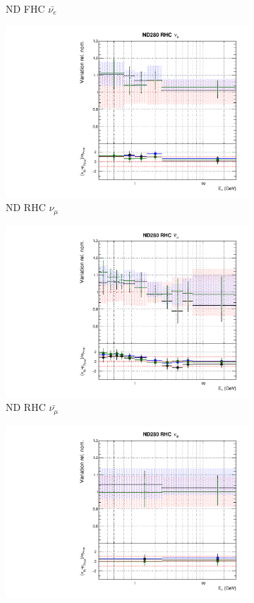 \begin{figure}
\begin{subfigure}{0.45\textwidth}
  \caption{ND FHC $\bar{\nu_{e}}$}  
\end{subfigure}
\begin{subfigure}{0.45\textwidth}
  \centering
  \includegraphics[width=0.75\linewidth]{figs/fgdfitsflux_4}
  \caption{ND RHC $\nu_{\mu}$}
\end{subfigure}
\begin{subfigure}{0.45\textwidth}
  \centering
  \includegraphics[width=0.75\linewidth]{figs/fgdfitsflux_5}
  \caption{ND RHC $\bar{\nu_{\mu}}$}
\end{subfigure}
\begin{subfigure}{0.45\textwidth}
  \centering
  \includegraphics[width=0.75\linewidth]{figs/fgdfitsflux_6}

\end{subfigure}
\end{figure}
